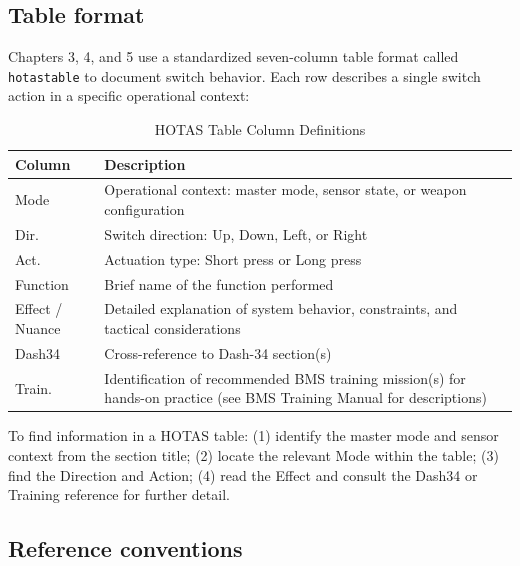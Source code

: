 \documentclass[11pt, a4paper, twoside]{report}
\begin{document}
\subsection{Table format}
\label{sec:C1-S3-S2}

Chapters 3, 4, and 5 use a standardized seven-column table format called \texttt{hotastable} to document switch behavior. Each row describes a single switch action in a specific operational context:

\begin{table}[H]
	\centering
	\caption{HOTAS Table Column Definitions}
	\label{tab:C1-hotastable-format}
	\small
	\renewcommand{\arraystretch}{1.25}
	\begin{tabular}{L{2.2cm} L{11.5cm}}
		\toprule
		\textbf{Column} & \textbf{Description} \\
		\midrule
		Mode & Operational context: master mode, sensor state, or weapon configuration \\
		Dir. & Switch direction: Up, Down, Left, or Right \\
		Act. & Actuation type: Short press or Long press \\
		Function & Brief name of the function performed \\
		Effect / Nuance & Detailed explanation of system behavior, constraints, and tactical considerations \\
		Dash34 & Cross-reference to Dash-34 section(s) \\
		Train. & Identification of recommended BMS training mission(s) for hands-on practice (see BMS Training Manual for descriptions) \\
		\bottomrule
	\end{tabular}
\end{table}

To find information in a HOTAS table: (1) identify the master mode and sensor context from the section title; (2) locate the relevant Mode within the table; (3) find the Direction and Action; (4) read the Effect and consult the Dash34 or Training reference for further detail.

\subsection{Reference conventions}
\label{sec:C1-S3-S3}
\end{document}
